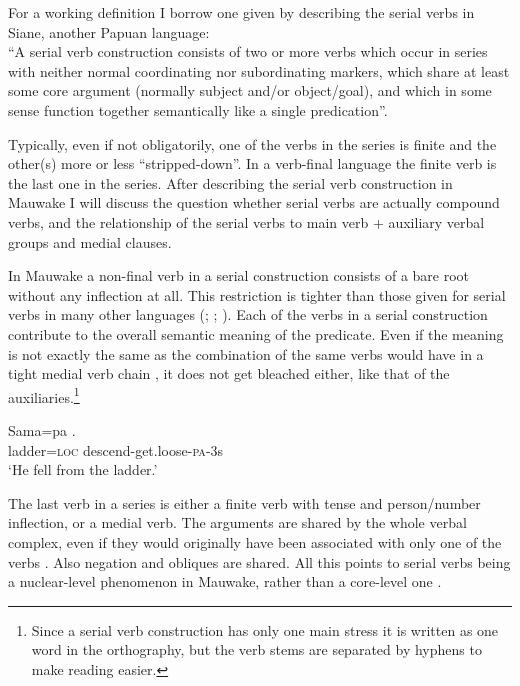 For a working definition I borrow one given by \citet[28]{James1983} describing the serial verbs in Siane, another Papuan language: \\
``A serial verb construction consists of two or more verbs which occur in series with neither normal coordinating nor subordinating markers, which share at least some core argument (normally subject and/or object/goal), and which in some sense function together semantically like a single predication''. 

Typically, even if not obligatorily, one of the verbs in the series is finite and the other(s) more or less ``stripped-down''. In a verb-final language the finite verb is the last one in the series. After describing the serial verb construction in Mauwake I will discuss the question whether serial verbs are actually compound verbs, and the relationship of the serial verbs to main verb + auxiliary verbal groups and medial clauses.

In Mauwake a non-final verb in a serial construction consists of a bare root without any inflection at all. This restriction is tighter than those given for serial verbs in many other languages (\citealt[19]{Crowley2002}; \citealt[86--87]{Sebba1987}; \citealt[28]{James1983}). Each of the verbs in a serial construction contribute to the overall semantic meaning of the predicate. Even if the meaning is not exactly the same as the combination of the same verbs would have in a tight medial verb chain \citep[cf.][310]{Payne1997}, it does not get bleached either, like that of the auxiliaries.\footnote{Since a serial verb construction has only one main stress it is written as one word in the orthography, but the verb stems are separated by hyphens to make reading easier.}

\ea%
\label{ex:3:x377}
\gll Sama=pa . \\
ladder=\textsc{loc} descend-get.loose-\textsc{pa}-3s\\
\glt`He fell from the ladder.'
\z

The last verb in a series is either a finite verb with tense and person/number inflection, or a medial verb. The arguments are shared by the whole verbal complex, even if they would originally have been associated with only one of the verbs . Also negation and obliques  are shared. All this points to serial verbs being a nuclear-level phenomenon in Mauwake, rather than a core-level one \citep[189--193]{FoleyEtAl1984}. 

